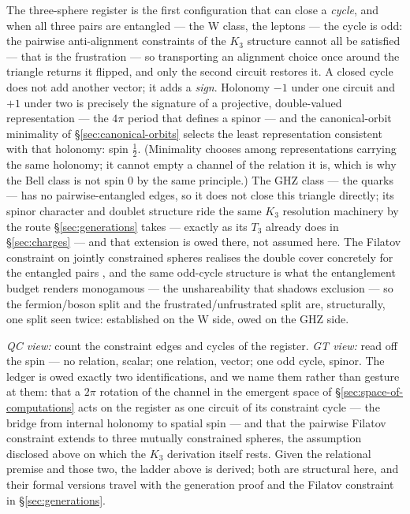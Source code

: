 The three-sphere register is the first configuration that can close a \emph{cycle}, and when all
three pairs are entangled --- the W class, the leptons --- the cycle is odd: the pairwise
anti-alignment constraints of the $K_3$ structure cannot all be satisfied --- that is the
frustration --- so transporting an alignment choice once around the triangle returns it flipped,
and only the second circuit restores it. A closed cycle does not add another vector; it
adds a \emph{sign}. Holonomy $-1$ under one circuit and $+1$ under two is precisely the signature
of a projective, double-valued representation --- the $4\pi$ period that defines a spinor --- and
the canonical-orbit minimality of \S\ref{sec:canonical-orbits} selects the least representation
consistent with that holonomy: spin $\tfrac12$. (Minimality chooses among representations carrying
the same holonomy; it cannot empty a channel of the relation it is, which is why the Bell class is
not spin $0$ by the same principle.) The GHZ class --- the quarks --- has no
pairwise-entangled edges, so it does not close this triangle directly; its spinor character and
doublet structure ride the same $K_3$ resolution machinery by the route \S\ref{sec:generations}
takes --- exactly as its $T_3$ already does in \S\ref{sec:charges} --- and that extension is owed
there, not assumed here. The Filatov constraint on jointly constrained spheres realises the double
cover concretely for the entangled pairs \autocite{filatov2024towards}, and the same odd-cycle
structure is what the entanglement budget renders monogamous --- the unshareability that shadows
exclusion --- so the fermion/boson split and the frustrated/unfrustrated split are, structurally,
one split seen twice: established on the W side, owed on the GHZ side.

\emph{QC view:} count the constraint edges and cycles of the register. \emph{GT view:} read off
the spin --- no relation, scalar; one relation, vector; one odd cycle, spinor. The ledger is owed
exactly two identifications, and we name them rather than gesture at them: that a $2\pi$ rotation
of the channel in the emergent space of \S\ref{sec:space-of-computations} acts on the register as
one circuit of its constraint cycle --- the bridge from internal holonomy to spatial spin --- and
that the pairwise Filatov constraint extends to three mutually constrained spheres, the assumption
disclosed above on which the $K_3$ derivation itself rests. Given the relational premise and those
two, the ladder above is derived; both are structural here, and their formal versions travel with
the generation proof and the Filatov constraint in \S\ref{sec:generations}.

